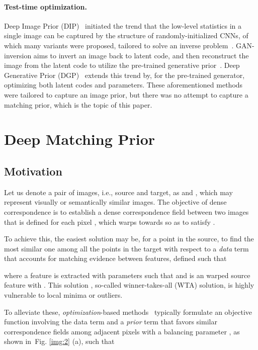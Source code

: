 \documentclass[10pt,twocolumn,letterpaper]{article}
\newcommand{\figref}[1]{Fig. \ref{#1}}
\begin{document}
\paragraph{Test-time optimization.} 
Deep Image Prior (DIP)~\cite{ulyanov2018deep} initiated the trend that the low-level statistics in a single image can be captured by the structure of randomly-initialized CNNs, of which many variants were proposed, tailored to solve an inverse problem~\cite{dong2014learning,xu2014deep,shocher2018zero,kanazawa2018end}. 
GAN-inversion aims to invert an image back to latent code, and then reconstruct the image from the latent code to utilize the pre-trained generative prior~\cite{gansteerability,abdal2019image2stylegan,gu2020image,karras2019style,karras2020analyzing,zhu2020domain}. Deep Generative Prior (DGP)~\cite{pan2020dgp} extends this trend by, for the pre-trained generator, optimizing both latent codes and parameters. These aforementioned methods were tailored to capture an image prior, but there was no attempt to capture a matching prior, which is the topic of this paper. 


\section{Deep Matching Prior}\label{sec:3}
\subsection{Motivation}\label{sec:3_1}
Let us denote a pair of images, i.e., source and target, as  and , which may represent visually or semantically similar images. The objective of dense correspondence is to establish a dense correspondence field  between two images that is defined for each pixel , which warps  towards  so as to satisfy .

To achieve this, the easiest solution may be, for a point in the source, to find the most similar one among all the points in the target with respect to a \emph{data} term that accounts for matching evidence between features, defined such that

where a feature  is extracted with parameters  such that  and  is an warped source feature with . This solution , so-called winner-takes-all (WTA) solution, is highly vulnerable to local minima or outliers.
 
To alleviate these, \emph{optimization}-based methods~\cite{anguelov2005scape,liu2010sift,bleyer2011patchmatch,taniai2016joint,liao2017visual,kim2017dctm} typically formulate an objective function involving the data term and a \emph{prior} term that favors similar correspondence fields among adjacent pixels with a balancing parameter , as shown in~\figref{img:2} (a), such that
\end{document}
